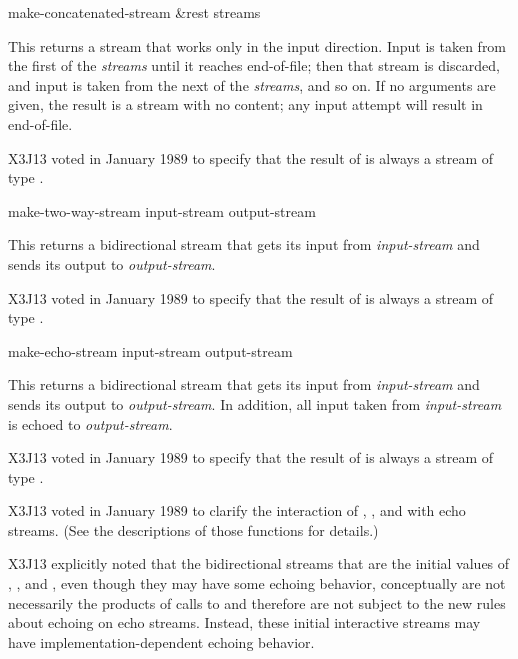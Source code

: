 \begin{defun}[Function]
make-concatenated-stream &rest streams

This returns a stream that works only in the input direction.
Input is taken from the first of the \emph{streams} until it reaches
end-of-file; then that stream is discarded, and input is taken
from the next of the \emph{streams}, and so on.  If no arguments
are given, the result is a stream with no content; any input attempt
will result in end-of-file.
\begin{new}
X3J13 voted in January 1989
to specify that the result of
 is always a stream of type .
\end{new}
\end{defun}

\begin{defun}[Function]
make-two-way-stream input-stream output-stream

This returns a bidirectional stream that gets its input from \emph{input-stream}
and sends its output to \emph{output-stream}.
\begin{new}
X3J13 voted in January 1989
to specify that the result of
 is always a stream of type .
\end{new}
\end{defun}

\begin{defun}[Function]
make-echo-stream input-stream output-stream

This returns a bidirectional stream that gets its input from \emph{input-stream}
and sends its output to \emph{output-stream}.  In addition, all
input taken from \emph{input-stream} is echoed to \emph{output-stream}.
\begin{new}
X3J13 voted in January 1989
to specify that the result of
 is always a stream of type .
\end{new}

\begin{new}
X3J13 voted in January 1989
to clarify the interaction of
, , and  with echo streams.
(See the descriptions of those functions for details.)

X3J13 explicitly noted that the bidirectional streams that are the initial
values of , , and ,
even though they may have some echoing behavior, conceptually
are not necessarily the products of calls to 
and therefore are not subject to the new rules about echoing on echo
streams.  Instead, these initial interactive streams may have
implementation-dependent echoing behavior.
\end{new}
\end{defun}

